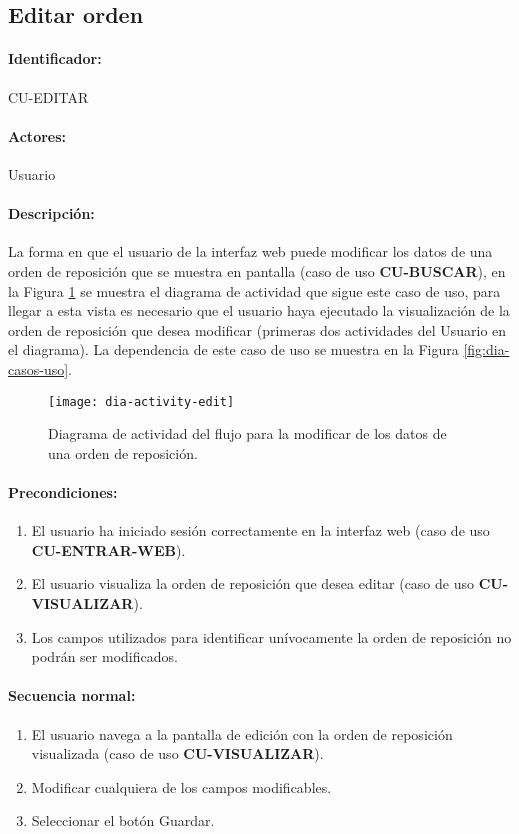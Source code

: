\subsection{Editar orden}\label{cu-editar}
\paragraph{Identificador:}
CU-EDITAR
\paragraph{Actores:}
Usuario
\paragraph{Descripción:}
La forma en que el usuario de la interfaz web puede modificar los datos de una orden de reposición que se muestra en pantalla (caso de uso \textbf{CU-BUSCAR}), en la Figura \ref{fig:dia-activity-edit} se muestra el diagrama de actividad que sigue este caso de uso, para llegar a esta vista es necesario que el usuario haya ejecutado la visualización de la orden de reposición que desea modificar (primeras dos actividades del Usuario en el diagrama). La dependencia de este caso de uso se muestra en la Figura \ref{fig:dia-casos-uso}.
\begin{figure}[h]
  \centering
  \texttt{[image: dia-activity-edit]}
  \caption{Diagrama de actividad del flujo para la modificar de los datos de una orden de reposición.}
  \label{fig:dia-activity-edit}
\end{figure}
\paragraph{Precondiciones:}
\begin{enumerate}
  \item El usuario ha iniciado sesión correctamente en la interfaz web (caso de uso \textbf{CU-ENTRAR-WEB}).
  \item El usuario visualiza la orden de reposición que desea editar (caso de uso \textbf{CU-VISUALIZAR}).
  \item Los campos utilizados para identificar unívocamente la orden de reposición no podrán ser modificados. 
\end{enumerate}
\paragraph{Secuencia normal:}
\begin{enumerate}
  \item El usuario navega a la pantalla de edición con la orden de reposición visualizada (caso de uso \textbf{CU-VISUALIZAR}).
  \item Modificar cualquiera de los campos modificables.
  \item Seleccionar el botón Guardar.
\end{enumerate}
